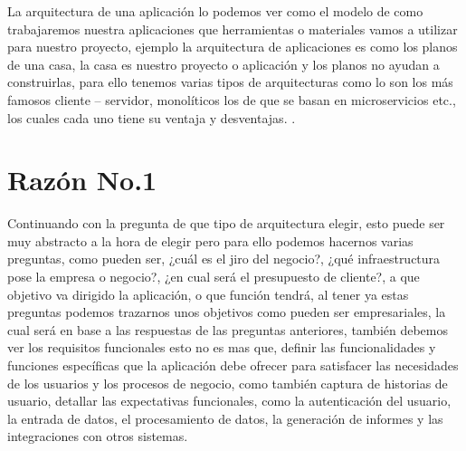 \documentclass[11pt,letterpaper]{article}
\begin{document}
La arquitectura de una aplicación lo podemos ver como el modelo de como trabajaremos nuestra aplicaciones que herramientas o materiales vamos a utilizar para nuestro proyecto, ejemplo la arquitectura de aplicaciones es como los planos de una casa, la casa es nuestro proyecto o aplicación y los planos no ayudan a  construirlas, para ello tenemos varias tipos de arquitecturas como lo son los más famosos cliente – servidor, monolíticos los de que se basan en microservicios etc., los cuales cada uno tiene su ventaja y desventajas.
\underline{}. 



\section{Razón No.1}


Continuando con la pregunta de que tipo de arquitectura elegir, esto puede ser muy abstracto a la hora de elegir pero para ello podemos hacernos varias preguntas, como pueden ser, ¿cuál es el jiro del negocio?, ¿qué infraestructura pose la empresa o negocio?, ¿en cual será el presupuesto de cliente?, a que objetivo va dirigido la aplicación, o que función tendrá, al tener ya estas preguntas podemos trazarnos unos objetivos como pueden ser empresariales, la cual será en base a las respuestas de las preguntas anteriores, también debemos ver los requisitos funcionales esto no es mas que, definir las funcionalidades y funciones específicas que la aplicación debe ofrecer para satisfacer las necesidades de los usuarios y los procesos de negocio, como también captura de historias de usuario, detallar las expectativas funcionales, como la autenticación del usuario, la entrada de datos, el procesamiento de datos, la generación de informes y las integraciones con otros sistemas.  



\begin{quote}

\end{quote}
\end{document}
